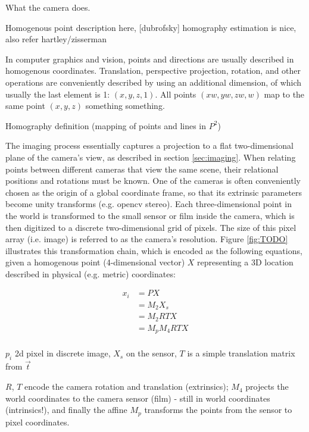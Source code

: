 What the camera does.

Homogenous point description here, [dubrofsky] homography estimation is nice, also refer hartley/zisserman

In computer graphics and vision, points and directions are usually described in homogenous coordinates. Translation, perspective projection, rotation, and other operations are conveniently described by using an additional dimension, of which usually the last element is 1: $(x, y, z, 1)$. All points $(xw, yw, zw, w)$ map to the same point $(x, y, z)$ something something.

Homography definition (mapping of points and lines in $P^2$)

The imaging process essentially captures a projection to a flat two-dimensional plane of the camera's view, as described in section \ref{sec:imaging}.
When relating points between different cameras that view the same scene, their relational positions and rotations must be known.
One of the cameras is often conveniently chosen as the origin of a global coordinate frame, so that its extrinsic parameters become unity transforms (e.g. opencv stereo).
Each three-dimensional point in the world is transformed to the small sensor or film inside the camera, which is then digitized to a discrete two-dimensional grid of pixels. The size of this pixel array (i.e. image) is referred to as the camera's resolution.
Figure \ref{fig:TODO} illustrates this transformation chain, which is encoded as the following equations, given a homogenous point (4-dimensional vector) $X$ representing a 3D location described in physical (e.g. metric) coordinates:

\begin{align}
	x_i &= P X\\
	  &= M_2 X_s\\ %
	  &= M_2 R T X\\
	  &= M_p M_4 R T X\\ %
\end{align}

$p_i$ 2d pixel in discrete image, $X_s$ on the sensor, $T$ is a simple translation matrix from $\vec t$

$R$, $T$ encode the camera rotation and translation (extrinsics); $M_4$ projects the world coordinates to the camera sensor (film) - still in world coordinates (intrinsics!), and finally the affine $M_p$ transforms the points from the sensor to pixel coordinates.

